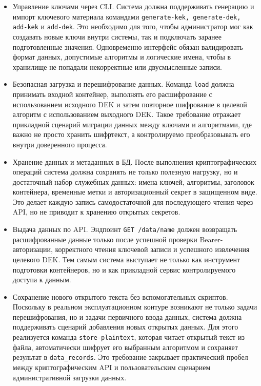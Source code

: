 \documentclass[14pt, a4paper]{extarticle}
\begin{document}
	\begin{itemize}
	\item Управление ключами через CLI. Система должна поддерживать генерацию и импорт ключевого материала командами \texttt{generate-kek, generate-dek, add-kek} и \texttt{add-dek}. Это необходимо для того, чтобы администратор мог как создавать новые ключи внутри системы, так и подключать заранее подготовленные значения. Одновременно интерфейс обязан валидировать формат данных, допустимые алгоритмы и логические имена, чтобы в хранилище не попадали некорректные или двусмысленные записи.
	\item Безопасная загрузка и перешифрование данных. Команда \texttt{load} должна принимать входной контейнер, выполнять его расшифрование с использованием исходного DEK и затем повторное шифрование в целевой алгоритм с использованием выходного DEK. Такое требование отражает прикладной сценарий миграции данных между ключами и алгоритмами, где важно не просто хранить шифртекст, а контролируемо преобразовывать его внутри доверенного процесса.
	\item Хранение данных и метаданных в БД. После выполнения криптографических операций система должна сохранять не только полезную нагрузку, но и достаточный набор служебных данных: имена ключей, алгоритмы, заголовок контейнера, временные метки и авторизационный секрет в защищенном виде. Это делает каждую запись самодостаточной для последующего чтения через API, но не приводит к хранению открытых секретов.
	\item Выдача данных по API. Эндпоинт \texttt{GET /data/{name}} должен возвращать расшифрованные данные только после успешной проверки Bearer-авторизации, корректного чтения ключевой записи и успешного извлечения целевого DEK. Тем самым система выступает не только как инструмент подготовки контейнеров, но и как прикладной сервис контролируемого доступа к данным.
	\item Сохранение нового открытого текста без вспомогательных скриптов. Поскольку в реальном эксплуатационном контуре возникают не только задачи перешифрования, но и задачи первичного ввода данных, система должна поддерживать сценарий добавления новых открытых данных. Для этого реализуется команда \texttt{store-plaintext}, которая читает открытый текст из файла, автоматически шифрует его выбранным алгоритмом и сохраняет результат в \texttt{data\_records}. Это требование закрывает практический пробел между криптографическим API и пользовательским сценарием административной загрузки данных.
	\end{itemize}
	
\end{document}
